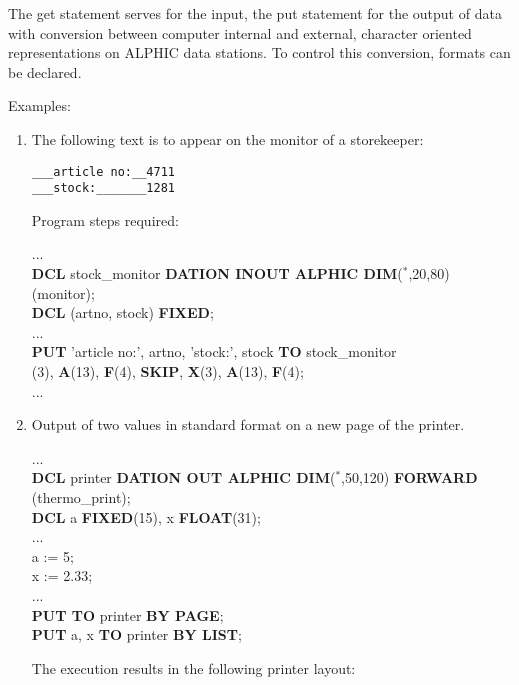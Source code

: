The get statement serves for the input, the put statement for the
output of data with conversion between computer internal and external,
character oriented representations on ALPHIC data stations. To control
this conversion, formats can be declared.

Examples:

\begin{enumerate}
\item The following text is to appear on the monitor of a storekeeper:

\begin{verbatim}
___article no:__4711
___stock:_______1281
\end{verbatim}

Program steps required:

...\\
{\bf DCL} stock\_monitor {\bf DATION INOUT ALPHIC DIM}($^*$,20,80)\\
 (monitor);\\
{\bf DCL} (artno, stock) {\bf FIXED};\\
...\\
{\bf PUT} 'article no:', artno, 'stock:', stock {\bf TO} stock\_monitor\\
(3), {\bf A}(13), {\bf F}(4), {\bf SKIP}, {\bf X}(3), {\bf A}(13), {\bf F}(4);\\
...

\item Output of two values in standard format on a new page of the
printer.

...\\
{\bf DCL} printer {\bf DATION OUT ALPHIC DIM}($^*$,50,120) {\bf FORWARD}\\
 (thermo\_print);\\
{\bf DCL} a {\bf FIXED}(15), x {\bf FLOAT}(31);\\
...\\
a := 5;\\
x := 2.33;\\
...\\
{\bf PUT TO} printer {\bf BY PAGE};\\
{\bf PUT} a, x {\bf TO} printer {\bf BY LIST};

The execution results in the following printer layout:


\end{enumerate}
